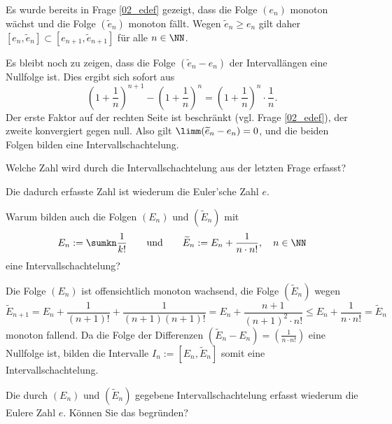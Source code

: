 \begin{antwort}
  Es wurde bereits in Frage \ref{02_edef} gezeigt, dass 
  die Folge $(e_n)$ monoton wächst  
  und die Folge $(\widetilde{e}_n)$ 
  monoton fällt. Wegen $\widetilde{e}_n \ge e_n$ 
  gilt daher $[e_n,\widetilde{e}_{n}]
  \subset [e_{n+1},\widetilde{e}_{n+1}]$ für alle $n\in \NN$.

  Es bleibt noch zu zeigen, dass die Folge $(\widetilde{e}_n-e_n)$ 
  der Intervallängen eine 
  Nullfolge ist. Dies ergibt sich sofort aus 
  \[
  \left( 1+\frac{1}{n} \right)^{n+1} -
  \left( 1+\frac{1}{n} \right)^n = 
  \left( 1+\frac{1}{n} \right)^n \cdot \frac{1}{n}.
  \]
  Der erste Faktor auf der rechten Seite ist beschränkt 
  (vgl. Frage \ref{02_edef}), der 
  zweite konvergiert gegen null. Also gilt $\limm (\widetilde{e}_n -e_n )=0$, und 
  die beiden Folgen bilden eine Intervallschachtelung.
  \AntEnd  
\end{antwort}

\begin{frage}
  Welche Zahl wird durch die Intervallschachtelung aus der letzten Frage erfasst?
\end{frage}

\begin{antwort}
  Die dadurch erfasste Zahl ist wiederum die Euler'sche Zahl $e$.
  \AntEnd
\end{antwort} 

\begin{frage}%
  \label{02_eina}
  Warum bilden auch die Folgen $(E_n)$ und $(\widetilde{E}_n)$ mit 
  \[
  E_n := \sumkn \frac{1}{k!} \qquad\text{und}\qquad
  \widetilde{E}_n := E_n + \frac{1}{n\cdot n!}, \quad n\in\NN
  \]
  eine Intervallschachtelung?
\end{frage}

\begin{antwort}
  Die Folge $(E_n)$ ist offensichtlich monoton wachsend, die 
  Folge $(\widetilde{E}_n)$ wegen
  \[
  \widetilde{E}_{n+1} = E_n + \frac{1}{(n+1)!} + \frac{1}{(n+1)(n+1)!} 
  = E_n + \frac{n+1}{(n+1)^2\cdot n!} \le 
  E_n + \frac{1}{n\cdot n!} = \widetilde{E}_n
  \]
  monoton fallend. 
  Da die Folge der Differenzen 
  $(\widetilde{E}_n-E_n)=( \frac{1}{n\cdot n!} )$ 
  eine Nullfolge ist, bilden die Intervalle 
  $I_n := [ E_n,\widetilde{E}_n]$ somit eine Intervallschachtelung. 
\end{antwort}

\begin{frage}
  Die durch $(E_n)$ und $(\widetilde{E}_n)$ gegebene Intervallschachtelung 
  erfasst wiederum die Euler\sch e Zahl 
  $e$. Können Sie das begründen?
\end{frage} 

